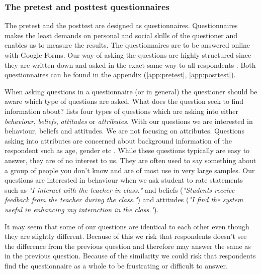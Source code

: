 \subsubsection*{The pretest and posttest questionnaires} %
The pretest and the posttest are designed as questionnaires. Questionnaires makes the least demands on personal and social skills of the questioner \cite[p.~74]{deacon2007researching} and enables us to measure the results. The questionnaires are to be answered online with Google Forms. Our way of asking the questions are highly structured since they are written down and asked in the exact same way to all respondents \cite[p.~65]{deacon2007researching}. Both questionnaires can be found in the appendix (\ref{app:pretest}, \ref{app:posttest}).

When asking questions in a questionnaire (or in general) the questioner should be aware which type of questions are asked. What does the question seek to find information about?  lists four types of questions which are asking into either \emph{behaviour}, \emph{beliefs}, \emph{attitudes} or \emph{attributes}. With our questions we are interested in behaviour, beliefs and attitudes. We are not focusing on attributes. Questions asking into attributes are concerned about background information of the respondent such as age, gender etc \cite[p.~75]{deacon2007researching}. While these questions typically are easy to answer, they are of no interest to us. They are often used to say something about a group of people you don't know and are of most use in very large samples. Our questions are interested in behaviour when we ask student to rate statements such as \emph{"I interact with the teacher in class."} and beliefs (\emph{"Students receive feedback from the teacher during the class."}) and attitudes (\emph{"I find the system useful in enhancing my interaction in the class."}).

It may seem that some of our questions are identical to each other even though they are slightly different. Because of this we risk that respondents doesn't see the difference from the previous question and therefore may answer the same as in the previous question. Because of the similarity we could risk that respondents find the questionnaire as a whole to be frustrating or difficult to answer.

